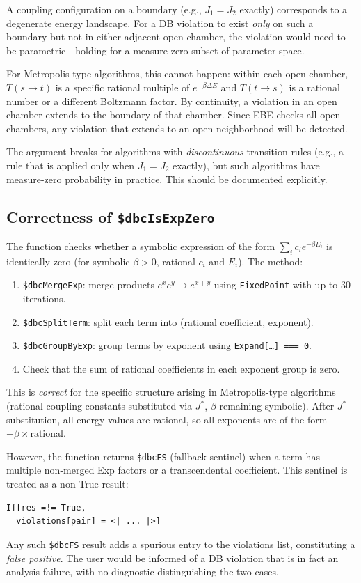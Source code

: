 \documentclass[12pt,a4paper]{article}
\theoremstyle{critical}
\theoremstyle{remark}
\begin{document}
A coupling configuration on a boundary (e.g., $J_1 = J_2$ exactly) corresponds to
a degenerate energy landscape. For a DB violation to exist \emph{only} on such a boundary
but not in either adjacent open chamber, the violation would need to be
parametric---holding for a measure-zero subset of parameter space.

For Metropolis-type algorithms, this cannot happen: within each open chamber, $T(s\to t)$
is a specific rational multiple of $e^{-\beta\Delta E}$ and $T(t\to s)$ is a rational
number or a different Boltzmann factor. By continuity, a violation in an open chamber
extends to the boundary of that chamber. Since EBE checks all open chambers, any
violation that extends to an open neighborhood will be detected.

The argument breaks for algorithms with \emph{discontinuous} transition rules (e.g., a
rule that is applied only when $J_1 = J_2$ exactly), but such algorithms have measure-zero
probability in practice. This should be documented explicitly.

\subsection{Correctness of \texttt{\$dbcIsExpZero}}

The function checks whether a symbolic expression of the form
$\sum_i c_i e^{-\beta E_i}$ is identically zero (for symbolic $\beta > 0$, rational
$c_i$ and $E_i$). The method:
\begin{enumerate}
\item \texttt{\$dbcMergeExp}: merge products $e^{x} e^{y} \to e^{x+y}$ using
  \texttt{FixedPoint} with up to 30 iterations.
\item \texttt{\$dbcSplitTerm}: split each term into (rational coefficient, exponent).
\item \texttt{\$dbcGroupByExp}: group terms by exponent using
  \texttt{Expand[\ldots] === 0}.
\item Check that the sum of rational coefficients in each exponent group is zero.
\end{enumerate}

This is \emph{correct} for the specific structure arising in Metropolis-type algorithms
(rational coupling constants substituted via $J^*$, $\beta$ remaining symbolic). After
$J^*$ substitution, all energy values are rational, so all exponents are of the form
$-\beta \times \text{rational}$.

However, the function returns \texttt{\$dbcFS} (fallback sentinel) when a term has
multiple non-merged Exp factors or a transcendental coefficient. This sentinel is treated
as a non-True result:
\begin{lstlisting}
If[res =!= True,
  violations[pair] = <| ... |>]
\end{lstlisting}
Any such \texttt{\$dbcFS} result adds a spurious entry to the violations list,
constituting a \emph{false positive}. The user would be informed of a DB violation
that is in fact an analysis failure, with no diagnostic distinguishing the two cases.
\end{document}
